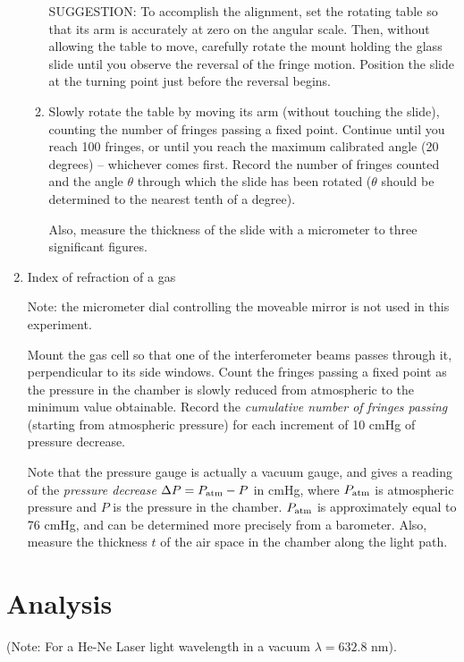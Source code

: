 \begin{enumerate}
\begin{enumerate}
SUGGESTION: To accomplish the alignment, set the rotating table 
so that its arm is accurately at zero on the angular scale. Then, 
without allowing the table to move, carefully rotate the mount 
holding the glass slide until you observe the reversal of the 
fringe motion. Position the slide at the turning point just before 
the reversal begins. 

\item Slowly rotate the table by moving its arm (without touching 
the slide), counting the number of fringes passing a fixed point. Continue until you 
reach 100 fringes, or until you reach the maximum calibrated 
angle (20 degrees) -- whichever comes first. Record the number 
of fringes counted and the angle $\theta$ through which the 
slide has been rotated ($\theta$ should be determined to the 
nearest tenth of a degree). 

Also, measure the thickness of the slide with a micrometer to 
three significant figures.
\end{enumerate}

\item Index of refraction of a gas

Note: the micrometer dial controlling the moveable mirror is 
not used in this experiment.

Mount the gas cell so that one of the interferometer beams passes 
through it, perpendicular to its side windows. Count the fringes 
passing a fixed point as the pressure in the chamber is slowly 
reduced from atmospheric to the minimum value obtainable. Record 
the {\em cumulative number of fringes passing} (starting from 
atmospheric pressure) for each increment of 10 cmHg of pressure 
decrease. 


Note that the pressure gauge is actually a vacuum gauge, and 
gives a reading of the {\em pressure decrease} $\Delta P = 
P_{\rm atm} - P$ in cmHg, where $P_{\rm atm}$ is atmospheric pressure and $P$ 
is the pressure in the chamber. $P_{\rm atm}$ is approximately equal 
to 76 cmHg, and can be determined more precisely from a barometer. 
Also, measure the thickness $t$ of the air space in the chamber 
along the light path.


\end{enumerate}

\section{Analysis}


(Note: For a He-Ne Laser light wavelength in a vacuum $ \lambda
= 632.8$ nm). 


